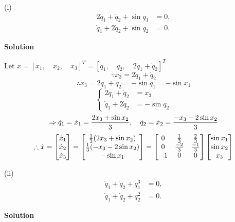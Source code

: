 \documentclass[12pt,a4paper]{article}
\begin{document}
\noindent (i)
\[
\begin{aligned}
2\ddot q_1+\ddot q_2+\sin q_1&=0,\\
\dot q_1+2\dot q_2+\sin q_2&=0.
\end{aligned}
\]

\textbf{Solution}

Let $x = [x_1,\quad x_2,\quad x_3]^T = [q_1,\quad q_2,\quad 2 \dot q_1 + \dot q_2]^T$
\[
	\because x_3 = 2\dot q_1 + \dot q_2  
\]
\[
	\therefore \dot x_3 = 2 \ddot q_1 + \ddot q_2 = -\sin q_1 = -\sin x_1
\]
\[
\begin{cases}
	2 \dot q_1 + \dot q_2 &= x_3 \\
	\dot q_1 + 2 \dot q_2 &= -\sin q_2
\end{cases}
\]
\[
\Rightarrow \dot q_1 =\dot x_1 = { 2x_3 + \sin x_2 \over 3}, \quad \dot q_2 =\dot x_2 = {-x_3 - 2 \sin x_2 \over 3}
\]
\[
\therefore \dot x = \begin{bmatrix}
	\dot x_1 \\ \dot x_2 \\ \dot x_3
\end{bmatrix} = \begin{bmatrix}
	{1\over3} (2x_3 + \sin x_2) \\
	{1\over3} (-x_3 - 2\sin x_2) \\
	-\sin x_1 
\end{bmatrix} = \begin{bmatrix}
0 & {1\over3} & {2\over3} \\
0 & {-2\over3} & {-1\over3} \\
-1 & 0 & 0
\end{bmatrix} \begin{bmatrix}
\sin x_1 \\ \sin x_2 \\ x_3
\end{bmatrix}
\]

\noindent (ii)
\[
\begin{aligned}
\ddot q_1+\dot q_2+q_1^3&=0,\\
\dot q_1+\dot q_2+q_2^2&=0.
\end{aligned}
\]

\textbf{Solution}
\end{document}
